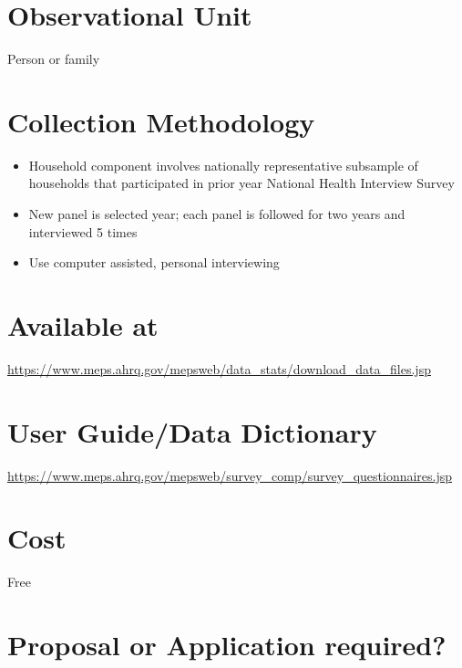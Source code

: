 \documentclass[
]{book}
\providecommand{\tightlist}{%
  \setlength{\itemsep}{0pt}\setlength{\parskip}{0pt}}
\begin{document}
\hypertarget{observational-unit-36}{%
\section{Observational Unit}\label{observational-unit-36}}

Person or family

\hypertarget{collection-methodology-36}{%
\section{Collection Methodology}\label{collection-methodology-36}}

\begin{itemize}
\tightlist
\item
  Household component involves nationally representative subsample of households that participated in prior year National Health Interview Survey
\item
  New panel is selected year; each panel is followed for two years and interviewed 5 times
\item
  Use computer assisted, personal interviewing
\end{itemize}

\hypertarget{available-at-36}{%
\section{Available at}\label{available-at-36}}

\url{https://www.meps.ahrq.gov/mepsweb/data_stats/download_data_files.jsp}

\hypertarget{user-guidedata-dictionary-36}{%
\section{User Guide/Data Dictionary}\label{user-guidedata-dictionary-36}}

\url{https://www.meps.ahrq.gov/mepsweb/survey_comp/survey_questionnaires.jsp}

\hypertarget{cost-36}{%
\section{Cost}\label{cost-36}}

Free

\hypertarget{proposal-or-application-required-36}{%
\section{Proposal or Application required?}\label{proposal-or-application-required-36}}
\end{document}
